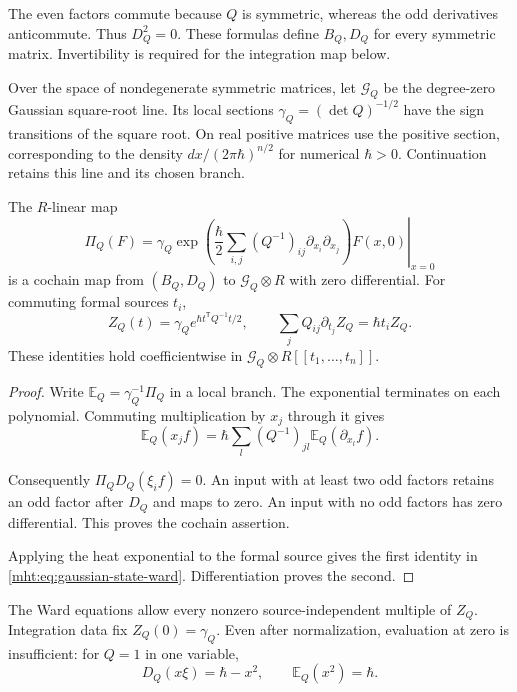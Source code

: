 The even factors commute because $Q$ is symmetric, whereas
the odd derivatives anticommute. Thus $D_Q^2=0$.
These formulas define $B_Q,D_Q$ for every symmetric matrix.
Invertibility is required for the integration map below.

Over the space of nondegenerate symmetric matrices, let
$\mathscr G_Q$ be the degree-zero Gaussian square-root line.
Its local sections $\gamma_Q=(\det Q)^{-1/2}$ have the sign
transitions of the square root. On real positive matrices use
the positive section, corresponding to the density
$dx/(2\pi\hbar)^{n/2}$ for numerical $\hbar>0$.
Continuation retains this line and its chosen branch.

\begin{proposition}\label{mht:prop:sourced-gaussian-state}
The $R$-linear map
\begin{equation}\label{mht:eq:sourced-gaussian-state}
 \Pi_Q(F)=\gamma_Q\left.
 \exp\!\left(\frac\hbar2
       \sum_{i,j}(Q^{-1})_{ij}\partial_{x_i}\partial_{x_j}\right)
                       F(x,0)\right|_{x=0}
\end{equation}
is a cochain map from $(B_Q,D_Q)$ to $\mathscr G_Q\otimes R$
with zero differential. For commuting formal sources $t_i$,
\begin{equation}\label{mht:eq:gaussian-state-ward}
 Z_Q(t)=\gamma_Qe^{\hbar t^{\mathsf T}Q^{-1}t/2},
 \qquad
 \sum_jQ_{ij}\partial_{t_j}Z_Q=\hbar t_iZ_Q.
\end{equation}
These identities hold coefficientwise in
$\mathscr G_Q\otimes R[[t_1,\ldots,t_n]]$.
\end{proposition}

\begin{proof}
Write $\mathbb E_Q=\gamma_Q^{-1}\Pi_Q$ in a local branch.
The exponential terminates on each polynomial.
Commuting multiplication by $x_j$ through it gives
\[
 \mathbb E_Q(x_jf)=\hbar\sum_l(Q^{-1})_{jl}
                                      \mathbb E_Q(\partial_{x_l}f).
\]

Consequently $\Pi_QD_Q(\xi_i f)=0$.
An input with at least two odd factors retains an odd factor
after $D_Q$ and maps to zero. An input with no odd factors
has zero differential. This proves the cochain assertion.

Applying the heat exponential to the formal source gives
the first identity in \eqref{mht:eq:gaussian-state-ward}.
Differentiation proves the second.
\end{proof}

The Ward equations allow every nonzero source-independent
multiple of $Z_Q$. Integration data fix $Z_Q(0)=\gamma_Q$.
Even after normalization, evaluation at zero is insufficient:
for $Q=1$ in one variable,
\[
 D_Q(x\xi)=\hbar-x^2,
 \qquad \mathbb E_Q(x^2)=\hbar.
\]

